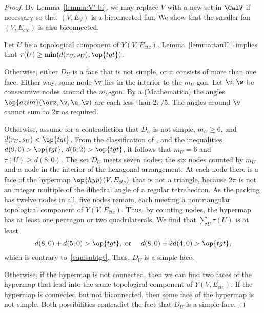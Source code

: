 \begin{proof}
  By Lemma~\ref{lemma:V'-bi}, we may replace $V$ with a new set in
  $\CalV$ if necessary so that $(V,E_V)$ is a biconnected fan.
   We  show that the smaller
  fan $(V,E_{ctc})$ is also biconnected.

  Let $U$ be a topological component of $Y(V,E_{ctc})$.  Lemma~\ref{lemma:tauU'}
   implies that $\tau(U)\ge \min(d(r_U,s_U),\op{tgt})$.

    Otherwise,
   either $D_U$ is a face that is not simple, or it consists of more than
   one face.  Either way, some node $\v$ lies in the interior to the
   $m_U$-gon.  Let $\u,\w$ be consecutive nodes around the $m_U$-gon.
   By a %
  {(Mathematica)} the angles
   $\op{azim}(\orz,\v,\u,\w)$ are each less than $2\pi/5$. The angles
   around $\v$ cannot sum to $2\pi$ as required.

     Otherwise, assume
   for a contradiction that $D_U$ is not simple, $m_U\ge 6$, and
   $d(r_U,s_U)<\op{tgt}$.  From the classification of
   \cite[p.~126,~Fig.~12.1]{Hales:2006:DCG}, and the inequalities
   $d(9,0) > \op{tgt}$, $d(6,2) > \op{tgt}$, it follows that 
    $m_U=6$ and $\tau(U)\ge d(8,0)$.  The set $D_U$ meets seven
   nodes: the six nodes counted by $m_U$ and a node in the interior of
   the hexagonal arrangement.  At each node there is a face of the
   hypermap $\op{hyp}(V,E_{ctc})$ that is not a triangle, because
   $2\pi$ is not an integer multiple of the dihedral angle of a
   regular tetrahedron.  As the packing has twelve nodes in all, five
   nodes remain, each meeting a nontriangular topological component of
   $Y(V,E_{ctc})$.  Thus, by counting nodes, the hypermap has at least
   one pentagon or two quadrilaterals.  We find that $\sum_{U}
   \tau(U)$ is at least
\[
d(8,0) + d(5,0) > \op{tgt}, \text{ or }\quad d(8,0) + 2 d(4,0) > \op{tgt},
\]
which is contrary to~\eqref{eqn:subtgt}.
Thus, $D_U$ is a simple face.
%
%

  Otherwise, if the hypermap is
not connected, then we can find two faces of the hypermap that lead
into the same topological component of $Y(V,E_{ctc})$.  If the
hypermap is connected but not biconnected, then some face of the
hypermap is not simple.  Both possibilities contradict the fact that
$D_U$ is a simple face.
\end{proof}



